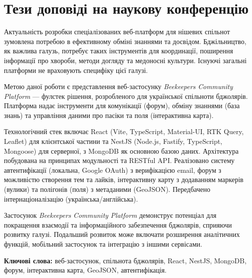 \section*{Тези доповіді на наукову конференцію}
\label{sec:conference_abstract}

Актуальність розробки спеціалізованих веб-платформ для нішевих спільнот зумовлена потребою в ефективному обміні знаннями та досвідом. Бджільництво, як важлива галузь, потребує таких інструментів для координації, поширення інформації про хвороби, методи догляду та медоносні культури. Існуючі загальні платформи не враховують специфіку цієї галузі.

Метою даної роботи є представлення веб-застосунку \textit{Beekeepers Community Platform} — фулстек рішення, розробленого для української спільноти бджолярів. Платформа надає інструменти для комунікації (форум), обміну знаннями (база знань) та управління даними про пасіки та поля (інтерактивна карта).

Технологічний стек включає React (Vite, TypeScript, Material-UI, RTK Query, Leaflet) для клієнтської частини та NestJS (Node.js, Fastify, TypeScript, Mongoose) для серверної, з MongoDB як основною базою даних. Архітектура побудована на принципах модульності та RESTful API. Реалізовано систему автентифікації (локальна, Google OAuth) з верифікацією email, форум з можливістю створення тем та лайків, інтерактивну карту з додаванням маркерів (вулики) та полігонів (поля) з метаданими (GeoJSON). Передбачено інтернаціоналізацію (українська/англійська).

Застосунок \textit{Beekeepers Community Platform} демонструє потенціал для покращення взаємодії та інформаційного забезпечення бджолярів, сприяючи розвитку галузі. Подальший розвиток може включати розширення аналітичних функцій, мобільний застосунок та інтеграцію з іншими сервісами.

\textbf{Ключові слова:} веб-застосунок, спільнота бджолярів, React, NestJS, MongoDB, форум, інтерактивна карта, GeoJSON, автентифікація.
\newpage 